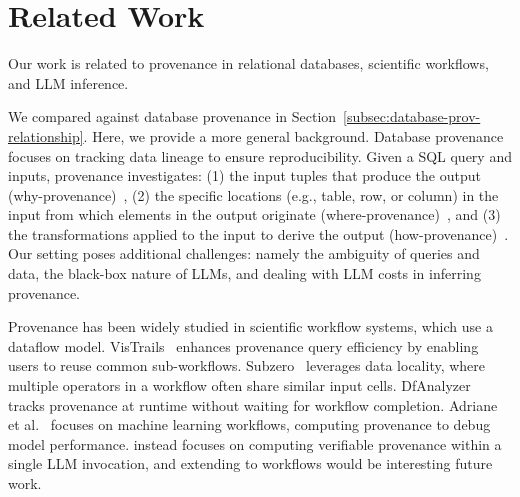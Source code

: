 \vspace{-2mm}
\section{Related Work}
\label{sec:relatedwork}
\vspace{-1mm}

Our work is related to provenance in relational databases, scientific workflows, and LLM inference. 

 We compared against database provenance in Section~\ref{subsec:database-prov-relationship}. Here, we provide a more general background. 
Database provenance~\cite{cheney2009provenance,buneman2007provenance,glavic2021data,karvounarakis2010querying} focuses on tracking data lineage to ensure reproducibility. 
Given a SQL query and inputs, provenance investigates: 
(1) the input tuples that produce the output (why-provenance)~\cite{cui2000tracing,buneman2001and,buneman2002propagation}, (2) the specific locations (e.g., table, row, or column) in the input from which elements in the output originate (where-provenance)~\cite{buneman2001and,bhagwat2005annotation}, and (3) the transformations applied to the input to derive the output (how-provenance)~\cite{green2007update,green2007provenance,green2007orchestra,hernandez2021computing}. 
Our setting poses additional challenges:
namely the ambiguity of queries and data,
the black-box nature of LLMs,
and dealing with LLM costs in inferring provenance.




Provenance has been widely studied in scientific workflow systems, which use a dataflow model.
VisTrails~\cite{scheidegger2008querying} enhances provenance query efficiency by enabling users to reuse common sub-workflows. %
Subzero~\cite{wu2013subzero} leverages data locality, where multiple operators in a workflow often share similar input cells. %
DfAnalyzer~\cite{silva2018dfanalyzer} tracks provenance at runtime without waiting for workflow completion.%
Adriane et al.~\cite{chapman2020capturing} focuses on machine learning workflows, computing provenance to debug model performance. 
\sys instead focuses on computing verifiable provenance within a single LLM invocation, and extending \sys to workflows would be interesting future work. 

